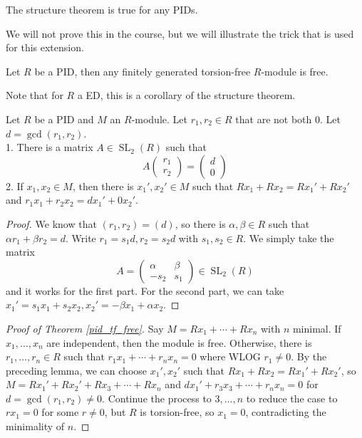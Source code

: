 \begin{theorem}
    The structure theorem is true for any PIDs.
\end{theorem}
We will not prove this in the course, but we will illustrate the trick that is used for this extension.
\begin{theorem}\label{pid_tf_free}
    Let $R$ be a PID, then any finitely generated torsion-free $R$-module is free.
\end{theorem}
Note that for $R$ a ED, this is a corollary of the structure theorem.
\begin{lemma}
    Let $R$ be a PID and $M$ an $R$-module.
    Let $r_1,r_2\in R$ that are not both $0$.
    Let $d=\gcd(r_1,r_2)$.\\
    1. There is a matrix $A\in\operatorname{SL}_2(R)$ such that
    $$A\begin{pmatrix}
        r_1\\
        r_2
    \end{pmatrix}=\begin{pmatrix}
        d\\
        0
    \end{pmatrix}$$
    2. If $x_1,x_2\in M$, then there is $x_1',x_2'\in M$ such that $Rx_1+Rx_2=Rx_1'+Rx_2'$ and $r_1x_1+r_2x_2=dx_1'+0x_2'$.
\end{lemma}
\begin{proof}
    We know that $(r_1,r_2)=(d)$, so there is $\alpha,\beta\in R$ such that $\alpha r_1+\beta r_2=d$.
    Write $r_1=s_1d,r_2=s_2d$ with $s_1,s_2\in R$.
    We simply take the matrix
    $$A=\begin{pmatrix}
        \alpha&\beta\\
        -s_2&s_1
    \end{pmatrix}\in\operatorname{SL}_2(R)$$
    and it works for the first part.
    For the second part, we can take $x_1'=s_1x_1+s_2x_2,x_2'=-\beta x_1+\alpha x_2$.
\end{proof}
\begin{proof}[Proof of Theorem \ref{pid_tf_free}]
    Say $M=Rx_1+\cdots+Rx_n$ with $n$ minimal.
    If $x_1,\ldots,x_n$ are independent, then the module is free.
    Otherwise, there is $r_1,\ldots,r_n\in R$ such that $r_1x_1+\cdots+r_nx_n=0$ where WLOG $r_1\neq 0$.
    By the preceding lemma, we can choose $x_1',x_2'$ such that $Rx_1+Rx_2=Rx_1'+Rx_2'$, so $M=Rx_1'+Rx_2'+Rx_3+\cdots+Rx_n$ and $dx_1'+r_3x_3+\cdots+r_nx_n=0$ for $d=\gcd(r_1,r_2)\neq 0$.
    Continue the process to $3,\ldots,n$ to reduce the case to $rx_1=0$ for some $r\neq 0$, but $R$ is torsion-free, so $x_1=0$, contradicting the minimality of $n$.
\end{proof}

